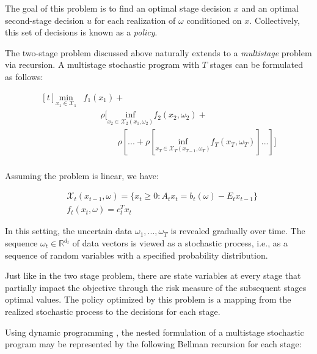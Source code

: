 \documentclass{juliacon}
\begin{document}
The goal of this problem is to find an optimal stage decision $x$ and an optimal second-stage decision $u$ for each realization of $\omega$ conditioned on $x$. Collectively, this set of decisions is known as a \textit{policy}.

The two-stage problem discussed above naturally extends to a \textit{multistage} problem via recursion. A multistage stochastic program with $T$ stages can be formulated as follows:

 \begin{equation*}
    \begin{aligned}[t]
        \underset{x_1 \in \mathcal{X}_1}{\text{min}}
        & f_1(x_1) + \\ 
        & \qquad \rho[ \underset{x_2 \in \mathcal{X}_2(x_1,\omega_{2})}{\text{inf}} f_2(x_2,\omega_{2}) + \\ 
        & \qquad \qquad \rho[... + \rho[\underset{x_T \in \mathcal{X}_T(x_{T-1},\omega_{T})}{\text{inf}} f_T(x_T,\omega_{T})]...]] \\
    \end{aligned}
\end{equation*}

Assuming the problem is linear, we have:

 \begin{equation*}
    \begin{aligned}
        & \mathcal{X}_{t}(x_{t-1},\omega) = \big\{ x_t \geq 0 : A_t x_t = b_t(\omega)- E_t x_{t-1} \big\} \\
        & f_t(x_t,\omega) = c_t^T x_t
    \end{aligned}
\end{equation*}

In this setting, the uncertain data $\omega_1 , ..., \omega_T$ is revealed gradually over time. The sequence $\omega_t \in \mathbb{R}^{d_t}$ of data vectors is viewed as a stochastic process, i.e., as a sequence of random variables with a specified probability distribution.

Just like in the two stage problem, there are state variables at every stage that partially impact the objective through the risk measure of the subsequent stages optimal values. The policy optimized by this problem is a mapping from the realized stochastic process to the decisions for each stage. 

Using dynamic programming \cite{bellman1966dynamic}, the nested formulation of a multistage stochastic program may be represented by the following Bellman recursion for each stage:
\end{document}
